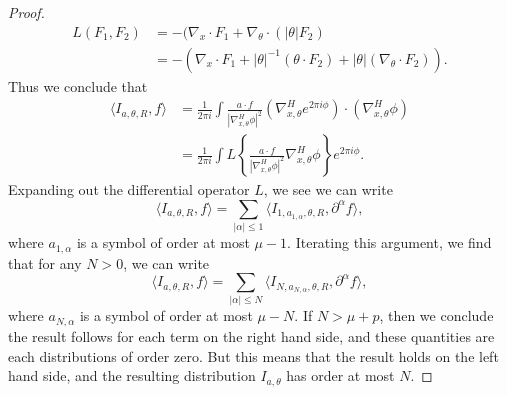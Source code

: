 \begin{proof}
    \begin{align*}
        L(F_1, F_2) &= - ( \nabla_x \cdot F_1 + \nabla_\theta \cdot ( |\theta| F_2 )\\
        &= - \left( \nabla_x \cdot F_1 + |\theta|^{-1} (\theta \cdot F_2) + |\theta| (\nabla_\theta \cdot F_2) \right).
    \end{align*}
    Thus we conclude that
    \begin{align*}
        \langle I_{a,\theta,R}, f \rangle &= \frac{1}{2 \pi i} \int \frac{a \cdot f}{|\nabla_{x,\theta}^H \phi|^2} \left( \nabla_{x,\theta}^H e^{2 \pi i \phi} \right) \cdot (\nabla_{x,\theta}^H \phi)\\
        &= \frac{1}{2 \pi i} \int L \left\{ \frac{a \cdot f}{|\nabla_{x,\theta}^H \phi|^2} \nabla_{x,\theta}^H \phi \right\} e^{2 \pi i \phi}.
    \end{align*}
    Expanding out the differential operator $L$, we see we can write
    \[ \langle I_{a,\theta,R}, f \rangle = \sum_{|\alpha| \leq 1} \langle I_{1,a_{1,\alpha}, \theta, R}, \partial^\alpha f \rangle, \]
    where $a_{1,\alpha}$ is a symbol of order at most $\mu - 1$. Iterating this argument, we find that for any $N > 0$, we can write
    \[ \langle I_{a,\theta,R}, f \rangle = \sum_{|\alpha| \leq N} \langle I_{N,a_{N,\alpha}, \theta, R}, \partial^\alpha f \rangle, \]
    where $a_{N,\alpha}$ is a symbol of order at most $\mu - N$. If $N > \mu + p$, then we conclude the result follows for each term on the right hand side, and these quantities are each distributions of order zero. But this means that the result holds on the left hand side, and the resulting distribution $I_{a,\theta}$ has order at most $N$.
\end{proof}


%
%

